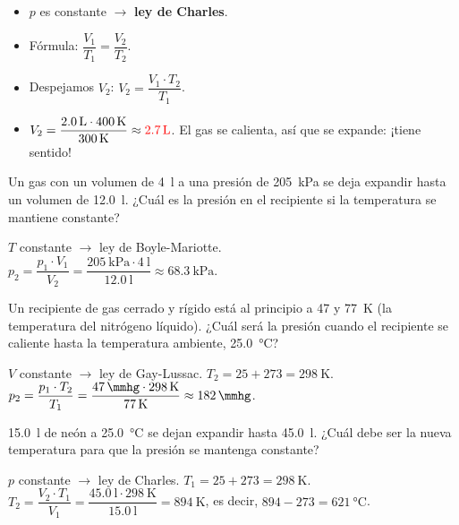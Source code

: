 \begin{example}
\begin{itemize}[leftmargin=2.3cm, labelwidth=2cm]
\begin{center}
\begin{tabular}{@{}ll@{}}
            \end{tabular}
        \end{center}
        \item[\textbf{Paso 6:}] \(p\) es constante \(\to\) \textbf{ley de Charles}.
        \item[\textbf{Paso 7:}] Fórmula: \(\dfrac{V_1}{T_1} = \dfrac{V_2}{T_2}\).
        \item[\textbf{Paso 8:}] Despejamos \(V_2\): \(V_2 = \dfrac{V_1 \cdot T_2}{T_1}\).
        \item[\textbf{Paso 9:}] \(V_2 = \dfrac{\qty{2.0}{\litre} \cdot \qty{400}{\kelvin}}{\qty{300}{\kelvin}} \approx \textcolor{red}{\qty{2.7}{\litre}}\). El gas se calienta, así que se expande: ¡tiene sentido!
    \end{itemize}
\end{example}

\begin{exercise}
    Un gas con un volumen de \qty{4}{\litre} a una presión de \qty{205}{\kilo\pascal} se deja expandir hasta un volumen de \qty{12.0}{\litre}. ¿Cuál es la presión en el recipiente si la temperatura se mantiene constante?
    \begin{solu}
        \(T\) constante \(\to\) ley de Boyle-Mariotte. \\
        \(p_2 = \dfrac{p_1 \cdot V_1}{V_2} = \dfrac{\qty{205}{\kilo\pascal} \cdot \qty{4}{\litre}}{\qty{12.0}{\litre}} \approx \qty{68.3}{\kilo\pascal}\).
    \end{solu}
\end{exercise}

\begin{exercise}
    Un recipiente de gas cerrado y rígido está al principio a \qty{47}{\mmhg} y \qty{77}{\kelvin} (la temperatura del nitrógeno líquido). ¿Cuál será la presión cuando el recipiente se caliente hasta la temperatura ambiente, \qty{25.0}{\celsius}?
    \begin{solu}
        \(V\) constante \(\to\) ley de Gay-Lussac. \(T_2 = 25 + 273 = \qty{298}{\kelvin}\). \\
        \(p_2 = \dfrac{p_1 \cdot T_2}{T_1} = \dfrac{\qty{47}{\mmhg} \cdot \qty{298}{\kelvin}}{\qty{77}{\kelvin}} \approx \qty{182}{\mmhg}\).
    \end{solu}
\end{exercise}

\begin{exercise}
    \qty{15.0}{\litre} de neón a \qty{25.0}{\celsius} se dejan expandir hasta \qty{45.0}{\litre}. ¿Cuál debe ser la nueva temperatura para que la presión se mantenga constante?
    \begin{solu}
        \(p\) constante \(\to\) ley de Charles. \(T_1 = 25 + 273 = \qty{298}{\kelvin}\). \\
        \(T_2 = \dfrac{V_2 \cdot T_1}{V_1} = \dfrac{\qty{45.0}{\litre} \cdot \qty{298}{\kelvin}}{\qty{15.0}{\litre}} = \qty{894}{\kelvin}\), es decir, \(894 - 273 = \qty{621}{\celsius}\).
    \end{solu}
\end{exercise}

